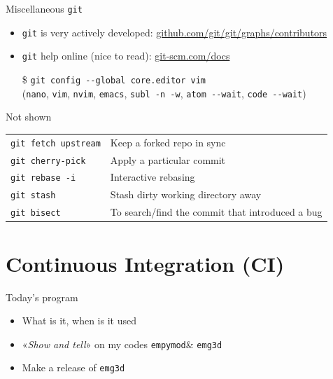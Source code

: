\documentclass[aspectratio=169]{beamer}
\newcommand{\emg}[2]{\texttt{emg#1#2}\xspace}
\newcommand{\empymod}{\texttt{empymod}\xspace}
\newcommand{\ato}{\addtocounter{framenumber}{1}}
\newcommand{\code}[1]{\texttt{\color{mygreen}#1}}
\begin{document}
\begin{frame}
  {Miscellaneous \code{git}}

  \begin{itemize}
    \item \code{git} is very actively developed:
      \href{https://github.com/git/git/graphs/contributors}%
      {github.com/git/git/graphs/contributors}
    \item \code{git} help online (nice to read):
      \href{https://git-scm.com/docs}{git-scm.com/docs}
    \item[\$] \code{git config -{}-global core.editor vim}\\
      (\code{nano}, \code{vim}, \code{nvim}, \code{emacs}, \code{subl -n -w},
      \code{atom -{}-wait}, \code{code -{}-wait})
  \end{itemize}


  \begin{block}{Not shown}
  \begin{tabular}{ll}
    \code{git fetch upstream} & Keep a forked repo in sync\\
    \code{git cherry-pick}  & Apply a particular commit\\
    \code{git rebase -i}    & Interactive rebasing\\
    \code{git stash}        & Stash dirty working directory away\\
    \code{git bisect}       & To search/find the commit that introduced a bug \\
  \end{tabular}
  \end{block}

\end{frame}

\ato %
\section{Continuous Integration (CI)}

\begin{frame}
  {Today's program}
  \begin{itemize}\itemsep0.5cm
      \item What is it, when is it used
      \item «\emph{Show and tell}» on my codes \empymod \& \emg3d
      \item Make a release of \emg3d
  \end{itemize}
\end{frame}
\end{document}
